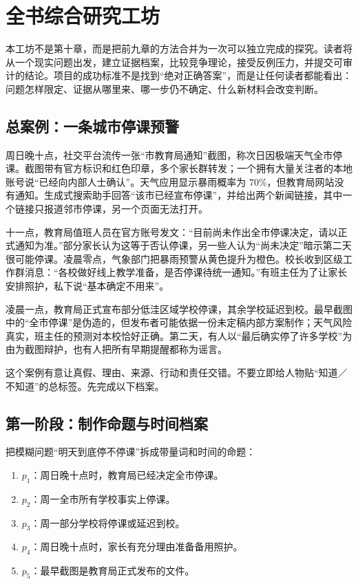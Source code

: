 \chapter{全书综合研究工坊}

本工坊不是第十章，而是把前九章的方法合并为一次可以独立完成的探究。读者将从一个现实问题出发，建立证据档案，比较竞争理论，接受反例压力，并提交可审计的结论。项目的成功标准不是找到“绝对正确答案”，而是让任何读者都能看出：问题怎样限定、证据从哪里来、哪一步仍不确定、什么新材料会改变判断。

\section{总案例：一条城市停课预警}

周日晚十点，社交平台流传一张“市教育局通知”截图，称次日因极端天气全市停课。截图带有官方标识和红色印章，多个家长群转发；一个拥有大量关注者的本地账号说“已经向内部人士确认”。天气应用显示暴雨概率为 \(70\%\)，但教育局网站没有通知。生成式搜索助手回答“该市已经宣布停课”，并给出两个新闻链接，其中一个链接只报道邻市停课，另一个页面无法打开。

十一点，教育局值班人员在官方账号发文：“目前尚未作出全市停课决定，请以正式通知为准。”部分家长认为这等于否认停课，另一些人认为“尚未决定”暗示第二天很可能停课。凌晨零点，气象部门把暴雨预警从黄色提升为橙色。校长收到区级工作群消息：“各校做好线上教学准备，是否停课待统一通知。”有班主任为了让家长安排照护，私下说“基本确定不用来”。

凌晨一点，教育局正式宣布部分低洼区域学校停课，其余学校延迟到校。最早截图中的“全市停课”是伪造的，但发布者可能依据一份未定稿内部方案制作；天气风险真实，班主任的预测对本校恰好正确。第二天，有人以“最后确实停了许多学校”为由为截图辩护，也有人把所有早期提醒都称为谣言。

这个案例有意让真假、理由、来源、行动和责任交错。不要立即给人物贴“知道／不知道”的总标签。先完成以下档案。

\section{第一阶段：制作命题与时间档案}

把模糊问题“明天到底停不停课”拆成带量词和时间的命题：

\begin{enumerate}
\item \(p_1\)：周日晚十点时，教育局已经决定全市停课。
\item \(p_2\)：周一全市所有学校事实上停课。
\item \(p_3\)：周一部分学校将停课或延迟到校。
\item \(p_4\)：周日晚十点时，家长有充分理由准备备用照护。
\item \(p_5\)：最早截图是教育局正式发布的文件。
\end{enumerate}

